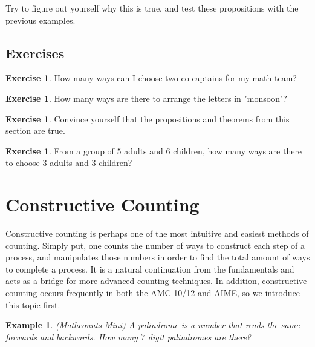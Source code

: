 \documentclass[letterpaper]{article}
\newtheorem{example}[thm]{Example}
\theoremstyle{remark}
\theoremstyle{definition}
\newtheorem{exercise}[thm]{Exercise}
\begin{document}
\bigskip

Try to figure out yourself why this is true, and test these propositions with the previous examples.

\subsection*{Exercises}

\begin{exercise}
How many ways can I choose two co-captains for my math team?
\end{exercise}

\begin{exercise}
How many ways are there to arrange the letters in "monsoon"?
\end{exercise}

\begin{exercise}
Convince yourself that the propositions and theorems from this section are true.
\end{exercise}

\begin{exercise}
From a group of $5$ adults and $6$ children, how many ways are there to choose $3$ adults and $3$ children?
\end{exercise}






\section{Constructive Counting}

Constructive counting is perhaps one of the most intuitive and easiest methods of counting. Simply put, one counts the number of ways to construct each step of a process, and manipulates those numbers in order to find the total amount of ways to complete a process. It is a natural continuation from the fundamentals and acts as a bridge for more advanced counting techniques. In addition, constructive counting occurs frequently in both the AMC 10/12 and AIME, so we introduce this topic first.

\bigskip

\begin{example}
(Mathcounts Mini) A palindrome is a number that reads the same forwards and backwards. How many $7$ digit palindromes are there?

\end{example}
\end{document}
